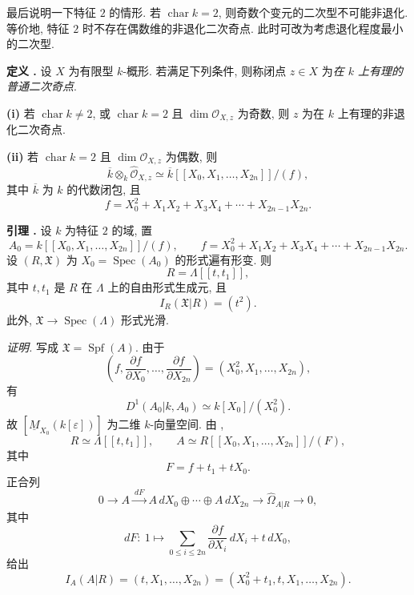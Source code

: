 最后说明一下特征 $2$ 的情形. 若 $\operatorname{char}k=2$, 则奇数个变元的二次型不可能非退化. 等价地, 特征 $2$ 时不存在偶数维的非退化二次奇点. 此时可改为考虑退化程度最小的二次型.



\par\medskip
\noindent\textbf{定义 .}
设 $X$ 为有限型 $k$-概形. 若满足下列条件, 则称闭点 $z\in X$ 为\emph{在 $k$ 上有理的普通二次奇点}.

\smallskip
\noindent\textbf{(i)} 若 $\operatorname{char}k\neq2$, 或 $\operatorname{char}k=2$ 且 $\dim\mathcal O_{X,z}$ 为奇数, 则 $z$ 为在 $k$ 上有理的非退化二次奇点.

\smallskip
\noindent\textbf{(ii)} 若 $\operatorname{char}k=2$ 且 $\dim\mathcal O_{X,z}$ 为偶数, 则
\[
\overline k\otimes_k\widehat{\mathcal O}_{X,z}
 \simeq
\overline k[[X_0,X_1,\ldots,X_{2n}]]/(f),
\]
其中 $\overline k$ 为 $k$ 的代数闭包, 且
\[
f=X_0^2+X_1X_2+X_3X_4+\cdots+X_{2n-1}X_{2n}.
\]

\par\medskip
\noindent\textbf{引理 .}
设 $k$ 为特征 $2$ 的域, 置
\[
A_0=k[[X_0,X_1,\ldots,X_{2n}]]/(f),
\qquad
f=X_0^2+X_1X_2+X_3X_4+\cdots+X_{2n-1}X_{2n}.
\]
设 $(R,\mathfrak X)$ 为 $X_0=\operatorname{Spec}(A_0)$ 的形式遍有形变. 则
\[
R=\Lambda[[t,t_1]],
\]
其中 $t,t_1$ 是 $R$ 在 $\Lambda$ 上的自由形式生成元, 且
\[
I_R(\mathfrak X|R)=(t^2).
\]
此外, $\mathfrak X\longrightarrow\operatorname{Spec}(\Lambda)$ 形式光滑.

\smallskip
\noindent\textit{证明.}
写成 $\mathfrak X=\operatorname{Spf}(A)$. 由于
\[
\left(f,\frac{\partial f}{\partial X_0},\ldots,
         \frac{\partial f}{\partial X_{2n}}\right)
=(X_0^2,X_1,\ldots,X_{2n}),
\]
有
\[
D^1(A_0|k,A_0)\simeq k[X_0]/(X_0^2).
\]
故 $[\underline M_{X_0}(k[\varepsilon])]$ 为二维 $k$-向量空间. 由 ,
\[
R\simeq\Lambda[[t,t_1]],
\qquad
A\simeq R[[X_0,X_1,\ldots,X_{2n}]]/(F),
\]
其中
\[
F=f+t_1+tX_0.
\]
正合列
\[
0\longrightarrow A\xrightarrow{\ dF\ }
A\,dX_0\oplus\cdots\oplus A\,dX_{2n}
\longrightarrow\widehat\Omega_{A|R}\longrightarrow0,
\]
其中
\[
dF:\ 1\longmapsto
\sum_{0\leq i\leq2n}\frac{\partial f}{\partial X_i}\,dX_i
+t\,dX_0,
\]
给出
\[
I_A(A|R)
=(t,X_1,\ldots,X_{2n})
=(X_0^2+t_1,t,X_1,\ldots,X_{2n}).
\]

